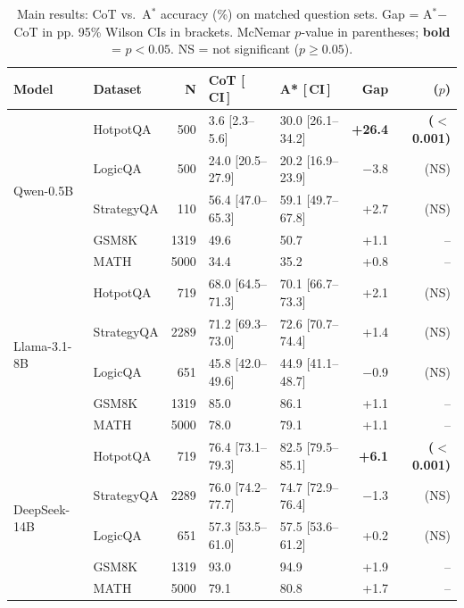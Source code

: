 \documentclass{article}
\newcommand{\astar}{A$^*$\xspace}
\begin{document}
\begin{table}[h]
\centering
\caption{Main results: CoT vs.\ \astar accuracy (\%) on matched question sets.
  Gap = \astar$-$CoT in pp. 95\% Wilson CIs in brackets.
  McNemar $p$-value in parentheses; \textbf{bold} = $p<0.05$.
  NS = not significant ($p\geq0.05$).}
\label{tab:main}
\small
\begin{tabular}{llrllrr}
\toprule
Model & Dataset & N & CoT [\,CI\,] & A* [\,CI\,] & Gap & ($p$) \\
\midrule
\multirow{5}{*}{Qwen-0.5B}
  & HotpotQA           & 500 & 3.6 [2.3--5.6]     & 30.0 [26.1--34.2] & \textbf{+26.4} & \textbf{($<$0.001)} \\
  & LogicQA            & 500 & 24.0 [20.5--27.9]  & 20.2 [16.9--23.9] & $-$3.8 & (NS) \\
  & StrategyQA         & 110 & 56.4 [47.0--65.3]  & 59.1 [49.7--67.8] & +2.7   & (NS) \\
  & GSM8K              & 1319 & 49.6               & 50.7              & +1.1   & -- \\
  & MATH               & 5000 & 34.4               & 35.2              & +0.8   & -- \\
\midrule
\multirow{5}{*}{Llama-3.1-8B}
  & HotpotQA           & 719  & 68.0 [64.5--71.3]  & 70.1 [66.7--73.3] & +2.1 & (NS) \\
  & StrategyQA         & 2289 & 71.2 [69.3--73.0]  & 72.6 [70.7--74.4] & +1.4 & (NS) \\
  & LogicQA            & 651  & 45.8 [42.0--49.6]  & 44.9 [41.1--48.7] & $-$0.9 & (NS) \\
  & GSM8K              & 1319 & 85.0               & 86.1              & +1.1   & -- \\
  & MATH               & 5000 & 78.0               & 79.1              & +1.1   & -- \\
\midrule
\multirow{5}{*}{DeepSeek-14B}
  & HotpotQA           & 719  & 76.4 [73.1--79.3]  & 82.5 [79.5--85.1] & \textbf{+6.1} & \textbf{($<$0.001)} \\
  & StrategyQA         & 2289 & 76.0 [74.2--77.7]  & 74.7 [72.9--76.4] & $-$1.3 & (NS) \\
  & LogicQA            & 651  & 57.3 [53.5--61.0]  & 57.5 [53.6--61.2] & +0.2   & (NS) \\
  & GSM8K              & 1319 & 93.0               & 94.9              & +1.9   & -- \\
  & MATH               & 5000 & 79.1               & 80.8              & +1.7   & -- \\
\bottomrule
\end{tabular}
\end{table}
\end{document}
